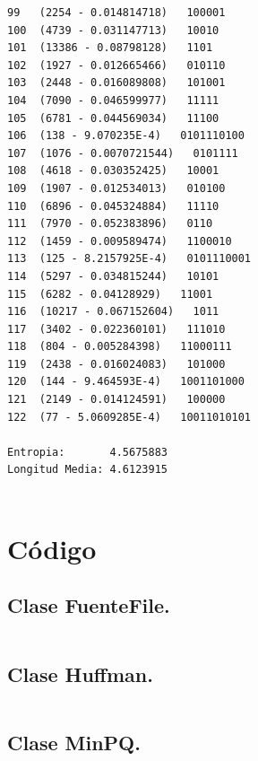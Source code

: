 \documentclass{article}
\begin{document}
\begin{verbatim}
99	 (2254 - 0.014814718)   100001
100	 (4739 - 0.031147713)   10010
101	 (13386 - 0.08798128)   1101
102	 (1927 - 0.012665466)   010110
103	 (2448 - 0.016089808)   101001
104	 (7090 - 0.046599977)   11111
105	 (6781 - 0.044569034)   11100
106	 (138 - 9.070235E-4)   0101110100
107	 (1076 - 0.0070721544)   0101111
108	 (4618 - 0.030352425)   10001
109	 (1907 - 0.012534013)   010100
110	 (6896 - 0.045324884)   11110
111	 (7970 - 0.052383896)   0110
112	 (1459 - 0.009589474)   1100010
113	 (125 - 8.2157925E-4)   0101110001
114	 (5297 - 0.034815244)   10101
115	 (6282 - 0.04128929)   11001
116	 (10217 - 0.067152604)   1011
117	 (3402 - 0.022360101)   111010
118	 (804 - 0.005284398)   11000111
119	 (2438 - 0.016024083)   101000
120	 (144 - 9.464593E-4)   1001101000
121	 (2149 - 0.014124591)   100000
122	 (77 - 5.0609285E-4)   10011010101

Entropia:       4.5675883
Longitud Media: 4.6123915
 
\end{verbatim}



\section{Código}


\subsection*{Clase FuenteFile.} 

\inputminted[mathescape,
               numbersep=5pt,
               frame=lines,
               framesep=2mm]{java}{practica3/FuenteFile.java}

 
\subsection*{Clase Huffman.} 
\inputminted[mathescape,
               numbersep=5pt,
               frame=lines,
               framesep=2mm]{java}{practica3/Huffman.java}
               
\subsection*{Clase MinPQ.} 
\inputminted[mathescape,
               numbersep=5pt,
               frame=lines,
               framesep=2mm]{java}{practica3/MinPQ.java}
               
\end{document}
